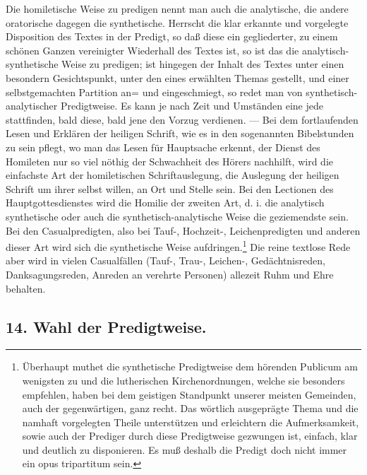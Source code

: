 Die homiletische Weise zu predigen nennt man auch die analytische, die andere oratorische dagegen die synthetische. Herrscht die klar erkannte und vorgelegte Disposition des Textes in der Predigt, so daß diese ein gegliederter, zu einem schönen Ganzen vereinigter Wiederhall des Textes ist, so ist das die analytisch-synthetische Weise zu predigen; ist hingegen der Inhalt des Textes unter einen besondern Gesichtspunkt, unter den eines erwählten Themas gestellt, und einer selbstgemachten Partition an= und eingeschmiegt, so redet man von synthetisch-analytischer Predigtweise. Es kann je nach Zeit und Umständen eine jede stattfinden, bald diese, bald jene den Vorzug verdienen. — Bei dem fortlaufenden Lesen und Erklären der heiligen Schrift, wie es in den sogenannten Bibelstunden zu sein pflegt, wo man das Lesen für Hauptsache erkennt, der Dienst des Homileten nur so viel nöthig der Schwachheit des Hörers nachhilft, wird die einfachste Art der homiletischen Schriftauslegung, die Auslegung der heiligen Schrift um ihrer selbst willen, an Ort und Stelle sein. Bei den Lectionen des Hauptgottesdienstes wird die Homilie der zweiten Art, d. i. die analytisch%
synthetische oder auch die synthetisch-analytische Weise die geziemendste sein. Bei den Casualpredigten, also bei Tauf-, Hochzeit-, Leichenpredigten und anderen dieser Art wird sich die synthetische Weise aufdringen.\footnote{Überhaupt muthet die synthetische Predigtweise dem hörenden Publicum am wenigsten zu und die lutherischen Kirchenordnungen, welche sie besonders empfehlen, haben bei dem geistigen Standpunkt unserer meisten Gemeinden, auch der gegenwärtigen, ganz recht. Das wörtlich ausgeprägte Thema und die namhaft vorgelegten Theile unterstützen und erleichtern die Aufmerksamkeit, sowie auch der Prediger durch diese Predigtweise gezwungen ist, einfach, klar und deutlich zu disponieren. Es muß deshalb die Predigt doch nicht immer ein opus tripartitum sein.} Die reine textlose Rede aber wird in vielen Casualfällen (Tauf-, Trau-, Leichen-, Gedächtnisreden, Danksagungsreden, Anreden an verehrte Personen) allezeit Ruhm und Ehre behalten.

\subsection*{14. Wahl der Predigtweise.}

